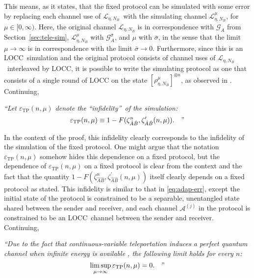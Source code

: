 \documentclass[apsrev,twocolumn]{revtex4-1}%
\begin{document}
This means, as it states, that the fixed protocol can be simulated with some
error by replacing each channel use of $\mathcal{L}_{\eta,N_{B}}$\ with the
simulating channel $\mathcal{L}_{\eta,N_{B}}^{\mu}$, for $\mu\in
\lbrack0,\infty)$. Here, the original channel $\mathcal{L}_{\eta,N_{B}}$ is in
correspondence with $\mathcal{G}_{A}$ from Section~\ref{sec:tele-sim},
$\mathcal{L}_{\eta,N_{B}}^{\mu}$ with $\mathcal{G}_{A}^{\bar{\sigma}}$, and
$\mu$ with $\bar{\sigma}$, in the sense that the limit $\mu\to\infty$ is in
correspondence with the limit $\bar{\sigma}\to0$. Furthermore, since this is
an LOCC\ simulation and the original protocol consists of channel uses of
$\mathcal{L}_{\eta,N_{B}}$\ interleaved by LOCC, it is possible to write the
simulating protocol as one that consists of a single round of LOCC on the
state $[\rho_{\eta,N_{B}}^{\mu}]^{\otimes n}$, as observed in
\cite{BDSW96,NFC09,Mul12}. Continuing,

\textit{\textquotedblleft Let $\varepsilon_{\operatorname{TP}}(n,\mu)$ denote
the \textquotedblleft infidelity\textquotedblright\ of the simulation:%
\begin{equation}
\varepsilon_{\operatorname{TP}}(n,\mu)\equiv1-F(\zeta_{\hat{A}\hat{B}}%
^{n},\zeta_{\hat{A}\hat{B}}^{\prime}(n,\mu)).\ \ \ \text{\textquotedblright}%
\end{equation}
}

In the context of the proof, this infidelity clearly corresponds to the
infidelity of the simulation of the fixed protocol. One might argue that the
notation $\varepsilon_{\operatorname{TP}}(n,\mu)$ somehow hides this
dependence on a fixed protocol, but the dependence of $\varepsilon
_{\operatorname{TP}}(n,\mu)$ on a fixed protocol is clear from the context and
the fact that the quantity $1-F(\zeta_{\hat{A}\hat{B}}^{n},\zeta_{\hat{A}%
\hat{B}}^{\prime}(n,\mu))$ itself clearly depends on a fixed protocol as
stated. This infidelity is similar to that in \eqref{eq:adap-err}, except the
initial state of the protocol is constrained to be a separable, unentangled
state shared between the sender and receiver, and each channel $\mathcal{A}%
^{(j)}$ in the protocol is constrained to be an LOCC\ channel between the
sender and receiver. Continuing,

\textit{\textquotedblleft Due to the fact that continuous-variable
teleportation induces a perfect quantum channel when infinite energy is
available \cite{prl1998braunstein}, the following limit holds for every $n$:%
\begin{equation}
\limsup_{\mu\rightarrow\infty}\varepsilon_{\operatorname{TP}}(n,\mu
)=0.\ \ \ \text{\textquotedblright}%
\end{equation}
}
\end{document}
